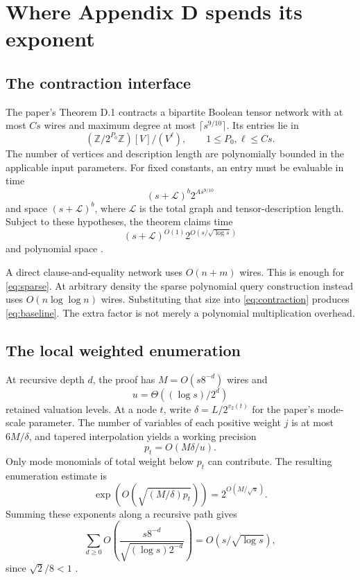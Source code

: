 \documentclass[11pt,letterpaper]{article}
\newcommand{\Z}{\mathbb Z}
\theoremstyle{remark}\newtheorem*{scope}{Scope}
\begin{document}
\section{Where Appendix D spends its exponent}
\subsection{The contraction interface}
The paper's Theorem D.1 contracts a bipartite Boolean tensor network with at most $Cs$ wires and maximum degree at most $\lceil s^{9/10}\rceil$. Its entries lie in
\[
 (\Z/2^{P_0}\Z)[V]/(V^\ell),\qquad 1\le P_0,\ell\le Cs.
\]
The number of vertices and description length are polynomially bounded in the applicable input parameters. For fixed constants, an entry must be evaluable in time
\[
 (s+\mathcal L)^b 2^{A s^{9/10}}
\]
and space $(s+\mathcal L)^b$, where $\mathcal L$ is the total graph and tensor-description length. Subject to these hypotheses, the theorem claims time
\begin{equation}\label{eq:contraction}
 (s+\mathcal L)^{O(1)}2^{O(s/\sqrt{\log s})}
\end{equation}
and polynomial space \cite{reduction}.

A direct clause-and-equality network uses $O(n+m)$ wires. This is enough for \eqref{eq:sparse}. At arbitrary density the sparse polynomial query construction instead uses $O(n\log\log n)$ wires. Substituting that size into \eqref{eq:contraction} produces \eqref{eq:baseline}. The extra factor is not merely a polynomial multiplication overhead.

\subsection{The local weighted enumeration}
At recursive depth $d$, the proof has $M=O(s8^{-d})$ wires and
\[
 u=\Theta((\log s)/2^d)
\]
retained valuation levels. At a node $t$, write $\delta=L/2^{v_2(t)}$ for the paper's mode-scale parameter. The number of variables of each positive weight $j$ is at most $6M/\delta$, and tapered interpolation yields a working precision
\[
 p_t=O(M\delta/u).
\]
Only mode monomials of total weight below $p_t$ can contribute. The resulting enumeration estimate is
\[
 \exp\!\left(O\!\left(\sqrt{(M/\delta)p_t}\right)\right)
 =2^{O(M/\sqrt u)}.
\]
Summing these exponents along a recursive path gives
\[
 \sum_{d\ge0} O\!\left(\frac{s8^{-d}}{\sqrt{(\log s)2^{-d}}}\right)
 =O(s/\sqrt{\log s}),
\]
since $\sqrt2/8<1$ \cite{contraction}.
\end{document}
